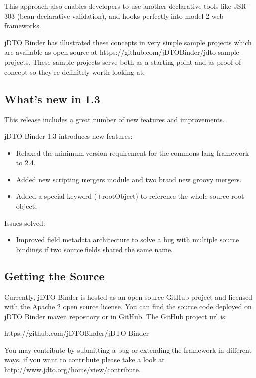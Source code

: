 \documentclass[11pt]{article}
\newcommand{\JDTO}{jDTO Binder\xspace}
\newcommand{\JDV}{1.3\xspace}
\begin{document}
This approach also enables developers to use another declarative tools like JSR-303 (bean declarative validation), and hooks perfectly into model 2 web frameworks.

\JDTO has illustrated these concepts in very simple sample projects which are available as open source at https://github.com/jDTOBinder/jdto-sample-projects. These sample projects serve both as a starting point and as proof of concept so they're definitely worth looking at.

\subsection{What's new in \JDV}

This release includes a great number of new features and improvements.

\JDTO \JDV introduces new features:
\begin{itemize}

\item Relaxed the minimum version requirement for the commons lang framework to 2.4.
\item Added new scripting mergers module and two brand new groovy mergers.
\item Added a special keyword (+rootObject) to reference the whole source root object.

\end{itemize}

Issues solved:

\begin{itemize}

\item Improved field metadata architecture to solve a bug with multiple source bindings if two source fields shared the same name.

\end{itemize}

\subsection{Getting the Source}

Currently, \JDTO is hosted as an open source GitHub project and licensed with the Apache 2 open source license. You can find the source code deployed on \JDTO maven repository or in GitHub. The GitHub project url is: 

https://github.com/jDTOBinder/jDTO-Binder

You may contribute by submitting a bug or extending the framework in different ways, if you want to contribute please take a look at http://www.jdto.org/home/view/contribute.
\end{document}
